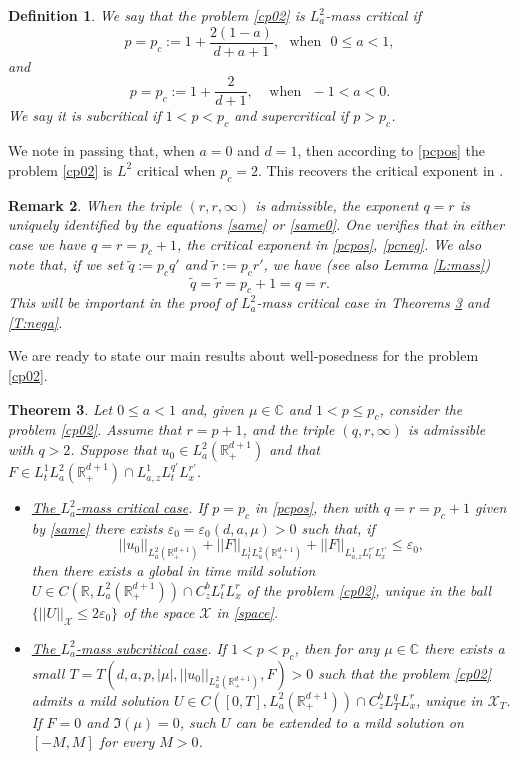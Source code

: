 \documentclass[11pt,letter]{amsart}
\def \RN {\mathbb{R}_+^{d+1}}
\def \R {\mathbb{R}}
\numberwithin{equation}{section}
\newcommand{\ve}{\varepsilon}
\newcommand{\Xs}{\mathcal X}
\newcommand{\XT}{\mathcal{X}_T}
\newcommand{\C}{\mathbb{C}}
\newtheorem{theorem}{Theorem}[section]
\newtheorem{remark}[theorem]{Remark}
\newtheorem{definition}[theorem]{Definition}
\numberwithin{equation}{section}
\begin{document}
\begin{definition}\label{D:mass}
We say that the problem \eqref{cp02} is $L^2_a$-\emph{mass critical} if
\begin{equation}\label{pcpos}
p = p_c := 1 + \frac{2(1-a)}{d+a+1},\ \ \ \text{when}\ \ \ 0\le a<1,  
\end{equation}
and
\begin{equation}\label{pcneg}
p = p_c := 1 + \frac{2}{d+1},\ \ \ \ \ \text{when}\ \ \ -1<a<0.
\end{equation}
We say it is \emph{subcritical} if $1<p< p_c$ and  \emph{supercritical} if $p> p_c$.
\end{definition}

We note in passing that, when $a=0$ and $d =1$, then according to \eqref{pcpos} the problem \eqref{cp02} is $L^2$ critical when $p_c=2$. This recovers the critical exponent in \cite[Theorems 1.1 \& 1.2]{OST3}.   

\begin{remark}\label{R:pc}
When the triple $(r,r,\infty)$ is admissible, the exponent $q=r$ is uniquely identified by the equations \eqref{same} or \eqref{same0}. One verifies that in either case we have $q=r = p_c+1$, the critical exponent in \eqref{pcpos}, \eqref{pcneg}. We also note that, if we set $\tilde q := p_c q'$ and $\tilde r := p_c r' $, we have (see also Lemma \ref{L:mass})
\[
\tilde q = \tilde r = p_c+1 = q = r.
\]
This will be important in the proof of $L^2_a$-mass critical case in Theorems \ref{T:well} and \ref{T:nega}.
\end{remark}

We are ready to state our main results about well-posedness for the problem \eqref{cp02}.

\begin{theorem}\label{T:well}
Let $0\le a<1$ and, given $\mu\in \C$ and $1<p\le p_c$, consider the problem \eqref{cp02}. Assume that $r = p+1$, and the triple $(q,r,\infty)$ is admissible with $q>2$. Suppose that $u_0\in L^2_a(\RN)$ and that  $F\in L^1_t L^2_a(\RN)\cap L^1_{a,z} L^{q'}_t L^{r'}_x $.
\begin{itemize}
\item[(1)] \underline{\emph{The $L^2_a$-mass critical case}}. If $p = p_c$ in \eqref{pcpos}, then with $q = r = p_c+1$ given by \eqref{same} there exists $\ve_0 = \ve_0(d,a,\mu)>0$ such that, if
\[
||u_0||_{L^2_a(\RN)} + ||F||_{L^1_t L^2_a(\RN)} + ||F||_{L^1_{a,z} L^{r'}_t L^{r'}_x} \le \ve_0,
\]
then there exists a global in time mild solution 
$U\in C(\R,L^2_a(\RN)) \cap C^{b}_z L^r_t L^r_x $ 
of the problem \eqref{cp02}, unique in the ball $\{||U||_{\Xs}\le 2\ve_0\}$ of the space $\Xs$ in \eqref{space}.
\item[(2)] \underline{\emph{The $L^2_a$-mass subcritical case}}. If $1<p<p_c$, then for any $\mu\in \C$ there exists a small $T = T(d,a,p,|\mu|,||u_0||_{L^2_a(\RN)},F)>0$ such that the problem \eqref{cp02} admits a mild solution $U\in C([0,T],L^2_a(\RN)) \cap C^{b}_z L^q_T L^r_x$, unique in $\XT$. 
If $F= 0$ and $\Im(\mu) = 0$, such $U$ can be extended to a mild solution on $[-M,M]$ for every $M>0$.
\end{itemize}
\end{theorem}
\end{document}
